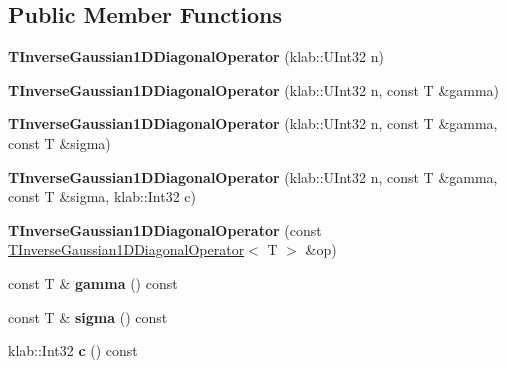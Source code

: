 \subsection*{Public Member Functions}
\begin{DoxyCompactItemize}
\item 
{\bfseries T\+Inverse\+Gaussian1\+D\+Diagonal\+Operator} (klab\+::\+U\+Int32 n)\hypertarget{classkl1p_1_1TInverseGaussian1DDiagonalOperator_a10197a1746d41e8ff957d65139e67af8}{}\label{classkl1p_1_1TInverseGaussian1DDiagonalOperator_a10197a1746d41e8ff957d65139e67af8}

\item 
{\bfseries T\+Inverse\+Gaussian1\+D\+Diagonal\+Operator} (klab\+::\+U\+Int32 n, const T \&gamma)\hypertarget{classkl1p_1_1TInverseGaussian1DDiagonalOperator_afe9227318fadd3ac49e5665bb5dfef32}{}\label{classkl1p_1_1TInverseGaussian1DDiagonalOperator_afe9227318fadd3ac49e5665bb5dfef32}

\item 
{\bfseries T\+Inverse\+Gaussian1\+D\+Diagonal\+Operator} (klab\+::\+U\+Int32 n, const T \&gamma, const T \&sigma)\hypertarget{classkl1p_1_1TInverseGaussian1DDiagonalOperator_ac7a56fee4545554a61bb3a10d8dde337}{}\label{classkl1p_1_1TInverseGaussian1DDiagonalOperator_ac7a56fee4545554a61bb3a10d8dde337}

\item 
{\bfseries T\+Inverse\+Gaussian1\+D\+Diagonal\+Operator} (klab\+::\+U\+Int32 n, const T \&gamma, const T \&sigma, klab\+::\+Int32 c)\hypertarget{classkl1p_1_1TInverseGaussian1DDiagonalOperator_ab70236c84c478492a015e8e61473108d}{}\label{classkl1p_1_1TInverseGaussian1DDiagonalOperator_ab70236c84c478492a015e8e61473108d}

\item 
{\bfseries T\+Inverse\+Gaussian1\+D\+Diagonal\+Operator} (const \hyperlink{classkl1p_1_1TInverseGaussian1DDiagonalOperator}{T\+Inverse\+Gaussian1\+D\+Diagonal\+Operator}$<$ T $>$ \&op)\hypertarget{classkl1p_1_1TInverseGaussian1DDiagonalOperator_a1db8296778ef61e2510edd16e96ad821}{}\label{classkl1p_1_1TInverseGaussian1DDiagonalOperator_a1db8296778ef61e2510edd16e96ad821}

\item 
const T \& {\bfseries gamma} () const \hypertarget{classkl1p_1_1TInverseGaussian1DDiagonalOperator_ad204508c60be12f8203809a5b4e102cc}{}\label{classkl1p_1_1TInverseGaussian1DDiagonalOperator_ad204508c60be12f8203809a5b4e102cc}

\item 
const T \& {\bfseries sigma} () const \hypertarget{classkl1p_1_1TInverseGaussian1DDiagonalOperator_a97a84c4fb5f03752bd414169e4b6f411}{}\label{classkl1p_1_1TInverseGaussian1DDiagonalOperator_a97a84c4fb5f03752bd414169e4b6f411}

\item 
klab\+::\+Int32 {\bfseries c} () const \hypertarget{classkl1p_1_1TInverseGaussian1DDiagonalOperator_aa0447d8b688d848d93898fb452cf30e8}{}\label{classkl1p_1_1TInverseGaussian1DDiagonalOperator_aa0447d8b688d848d93898fb452cf30e8}

\end{DoxyCompactItemize}
